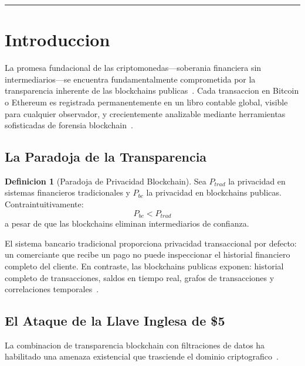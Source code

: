 \documentclass[11pt]{article}
\theoremstyle{definition}
\newtheorem{definicion}{Definicion}[section]
\theoremstyle{plain}
\theoremstyle{remark}
\begin{document}
\vspace{1em}
\hrule
\vspace{1em}

\section{Introduccion}
\label{sec:intro}

La promesa fundacional de las criptomonedas---soberania financiera sin intermediarios---se encuentra fundamentalmente comprometida por la transparencia inherente de las blockchains publicas~\cite{narayanan2016bitcoin}. Cada transaccion en Bitcoin o Ethereum es registrada permanentemente en un libro contable global, visible para cualquier observador, y crecientemente analizable mediante herramientas sofisticadas de forensia blockchain~\cite{meiklejohn2013fistful, ron2013quantitative, harrigan2016unreasonable}.

\subsection{La Paradoja de la Transparencia}

\begin{definicion}[Paradoja de Privacidad Blockchain]
Sea $P_{trad}$ la privacidad en sistemas financieros tradicionales y $P_{bc}$ la privacidad en blockchains publicas. Contraintuitivamente:
\begin{equation}
P_{bc} < P_{trad}
\end{equation}
a pesar de que las blockchains eliminan intermediarios de confianza.
\end{definicion}

El sistema bancario tradicional proporciona privacidad transaccional por defecto: un comerciante que recibe un pago no puede inspeccionar el historial financiero completo del cliente. En contraste, las blockchains publicas exponen: historial completo de transacciones, saldos en tiempo real, grafos de transacciones y correlaciones temporales~\cite{chen2020survey}.

\subsection{El Ataque de la Llave Inglesa de \$5}

La combinacion de transparencia blockchain con filtraciones de datos ha habilitado una amenaza existencial que trasciende el dominio criptografico~\cite{xkcd538}.
\end{document}

